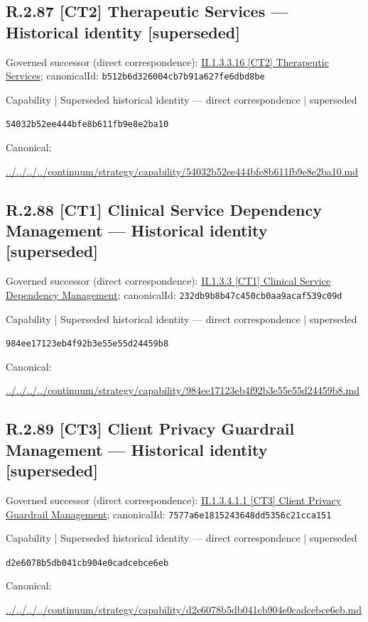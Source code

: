 \documentclass[10pt,a4paper]{article}
\begin{document}
\subsection*{R.2.87 [CT2] Therapeutic Services — Historical identity [superseded]}
Governed successor (direct correspondence): \hyperref[element-b512b6d326004cb7b91a627fe6dbd8be]{II.1.3.3.16 [CT2] Therapeutic Services}; canonicalId: \texttt{b512b6d326004cb7b91a627fe6dbd8be}\par
\label{element-54032b52ee444bfe8b611fb9e8e2ba10}
{\small Capability | Superseded historical identity — direct correspondence | superseded}\par
\texttt{54032b52ee444bfe8b611fb9e8e2ba10}\par
Canonical: \par
{\footnotesize\url{../../../../continuum/strategy/capability/54032b52ee444bfe8b611fb9e8e2ba10.md}}\par
\subsection*{R.2.88 [CT1] Clinical Service Dependency Management — Historical identity [superseded]}
Governed successor (direct correspondence): \hyperref[element-232db9b8b47c450cb0aa9acaf539c09d]{II.1.3.3 [CT1] Clinical Service Dependency Management}; canonicalId: \texttt{232db9b8b47c450cb0aa9acaf539c09d}\par
\label{element-984ee17123eb4f92b3e55e55d24459b8}
{\small Capability | Superseded historical identity — direct correspondence | superseded}\par
\texttt{984ee17123eb4f92b3e55e55d24459b8}\par
Canonical: \par
{\footnotesize\url{../../../../continuum/strategy/capability/984ee17123eb4f92b3e55e55d24459b8.md}}\par
\subsection*{R.2.89 [CT3] Client Privacy Guardrail Management — Historical identity [superseded]}
Governed successor (direct correspondence): \hyperref[element-7577a6e1815243648dd5356c21cca151]{II.1.3.4.1.1 [CT3] Client Privacy Guardrail Management}; canonicalId: \texttt{7577a6e1815243648dd5356c21cca151}\par
\label{element-d2e6078b5db041cb904e0cadcebce6eb}
{\small Capability | Superseded historical identity — direct correspondence | superseded}\par
\texttt{d2e6078b5db041cb904e0cadcebce6eb}\par
Canonical: \par
{\footnotesize\url{../../../../continuum/strategy/capability/d2e6078b5db041cb904e0cadcebce6eb.md}}\par
\end{document}
